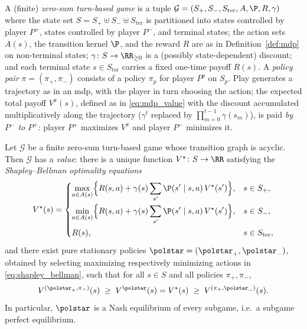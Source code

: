 \begin{definition}\label{def:turn_based_game}
A (finite) \emph{zero-sum turn-based game} is a tuple $\mathcal{G} = (S_{+}, S_{-}, S_{\mathrm{ter}}, A, \P, R, \gamma)$ where the state set $S = S_{+} \uplus S_{-} \uplus S_{\mathrm{ter}}$ is partitioned into states controlled by player $P^{+}$, states controlled by player $P^{-}$, and terminal states; the action sets $A(s)$, the transition kernel $\P$, and the reward $R$ are as in Definition~\ref{def:mdp} on non-terminal states; $\gamma \colon S \to \RR_{\ge 0}$ is a (possibly state-dependent) discount; and each terminal state $s \in S_{\mathrm{ter}}$ carries a fixed one-time payoff $R(s)$. A \emph{policy pair} $\pi = (\pi_{+}, \pi_{-})$ consists of a policy $\pi_{p}$ for player $P^{p}$ on $S_{p}$. Play generates a trajectory as in an \ac{mdp}, with the player in turn choosing the action; the expected total payoff $V^{\pi}(s)$, defined as in \eqref{eq:mdp_value} with the discount accumulated multiplicatively along the trajectory ($\gamma^t$ replaced by $\prod_{m=0}^{t-1}\gamma(s_m)$), is paid \emph{by $P^{-}$ to $P^{+}$}: player $P^{+}$ maximizes $V^{\pi}$ and player $P^{-}$ minimizes it.
\end{definition}

\begin{theoremenv}\label{thm:shapley_bellman}
Let $\mathcal{G}$ be a finite zero-sum turn-based game whose transition graph is acyclic. Then $\mathcal{G}$ has a \emph{value}: there is a unique function $V^{\star} \colon S \to \RR$ satisfying the \emph{Shapley--Bellman optimality equations}
\begin{equation}
	V^{\star}(s) =
	\begin{cases}
		\displaystyle \max_{a \in A(s)} \Bigl\{ R(s,a) + \gamma(s) \sum_{s'} \P(s' \mid s, a)\, V^{\star}(s') \Bigr\}, & s \in S_{+}, \\[1.2em]
		\displaystyle \min_{a \in A(s)} \Bigl\{ R(s,a) + \gamma(s) \sum_{s'} \P(s' \mid s, a)\, V^{\star}(s') \Bigr\}, & s \in S_{-}, \\[1.2em]
		R(s), & s \in S_{\mathrm{ter}},
	\end{cases}
	\label{eq:shapley_bellman}
\end{equation}
and there exist pure stationary policies $\polstar = (\polstar_{+}, \polstar_{-})$, obtained by selecting maximizing respectively minimizing actions in \eqref{eq:shapley_bellman}, such that for all $s \in S$ and all policies $\pi_{+}, \pi_{-}$,
\begin{equation}
	V^{(\polstar_{+}, \pi_{-})}(s) \;\ge\; V^{\polstar}(s) = V^{\star}(s) \;\ge\; V^{(\pi_{+}, \polstar_{-})}(s).
	\label{eq:saddle_point}
\end{equation}
In particular, $\polstar$ is a Nash equilibrium of every subgame, i.e.\ a subgame perfect equilibrium.
\hfill{}
\end{theoremenv}

